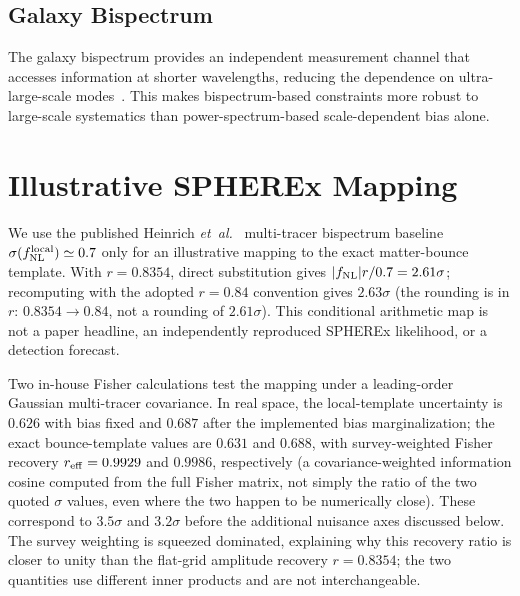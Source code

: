 \documentclass[aps,prd,twocolumn,superscriptaddress,showpacs,preprintnumbers,nofootinbib,longbibliography,floatfix]{revtex4-2}
\newcommand{\fnl}{f_{\rm NL}}
\newcommand{\etal}{\textit{et~al.}}
\begin{document}
\subsection{Galaxy Bispectrum}

The galaxy bispectrum provides an independent measurement channel that accesses information at shorter wavelengths, reducing the dependence on ultra-large-scale modes~\cite{Heinrich:2023}. This makes bispectrum-based constraints more robust to large-scale systematics than power-spectrum-based scale-dependent bias alone.

\section{Illustrative SPHEREx Mapping}
\label{sec:spherex}

We use the published Heinrich \etal~\cite{Heinrich:2023} multi-tracer bispectrum baseline $\sigma(\fnl^{\rm local})\simeq0.7$ only for an illustrative mapping to the exact matter-bounce template. With $r=0.8354$, direct substitution gives $|\fnl|r/0.7=2.61\sigma$; recomputing with the adopted $r=0.84$ convention gives $2.63\sigma$ (the rounding is in $r$: $0.8354\to0.84$, not a rounding of $2.61\sigma$). This conditional arithmetic map is not a paper headline, an independently reproduced SPHEREx likelihood, or a detection forecast.

Two in-house Fisher calculations test the mapping under a leading-order Gaussian multi-tracer covariance. In real space, the local-template uncertainty is $0.626$ with bias fixed and $0.687$ after the implemented bias marginalization; the exact bounce-template values are $0.631$ and $0.688$, with survey-weighted Fisher recovery $r_{\rm eff}=0.9929$ and $0.9986$, respectively (a covariance-weighted information cosine computed from the full Fisher matrix, not simply the ratio of the two quoted $\sigma$ values, even where the two happen to be numerically close). These correspond to $3.5\sigma$ and $3.2\sigma$ before the additional nuisance axes discussed below. The survey weighting is squeezed dominated, explaining why this recovery ratio is closer to unity than the flat-grid amplitude recovery $r=0.8354$; the two quantities use different inner products and are not interchangeable.
\end{document}
